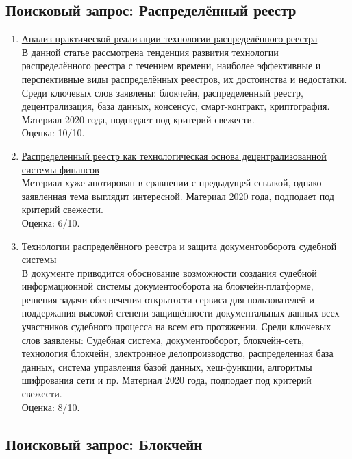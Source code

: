 \documentclass[a4paper, 12pt]{report}		%
\begin{document}
\subsection*{Поисковый запрос: Распределённый реестр}

\begin{enumerate}
\item \href{https://elibrary.ru/item.asp?id=44065996}{Анализ практической реализации технологии распределённого реестра}\\
В данной статье рассмотрена тенденция развития технологии распределённого реестра с течением времени, наиболее эффективные и перспективные виды распределённых реестров, их достоинства и недостатки. Среди ключевых слов заявлены: блокчейн, распределенный реестр, децентрализация, база данных, консенсус, смарт-контракт, криптография. Материал 2020 года, подподает под критерий свежести.\\
Оценка: 10/10.
\item \href{https://elibrary.ru/item.asp?id=44086179}{Распределенный реестр как технологическая основа децентрализованной системы финансов}\\
Метериал хуже анотирован в сравнении с предыдущей ссылкой, однако заявленная тема выглядит интересной. Материал 2020 года, подподает под критерий свежести.\\
Оценка: 6/10.
\item \href{https://cyberleninka.ru/article/n/tehnologii-raspredelyonnogo-reestra-i-zaschita-dokumentooborota-sudebnoy-sistemy}{Технологии распределённого реестра и защита документооборота судебной системы}\\
В документе приводится обоснование возможности создания судебной информационной системы документооборота на блокчейн-платформе, решения задачи обеспечения открытости сервиса для пользователей и поддержания высокой степени защищённости документальных данных всех участников судебного процесса на всем его протяжении. Среди ключевых слов заявлены: Судебная система, документооборот, блокчейн-сеть, технология блокчейн, электронное делопроизводство, распределенная база данных, система управления базой данных, хеш-функции, алгоритмы шифрования сети и пр. Материал 2020 года, подподает под критерий свежести.\\
Оценка: 8/10.
\end{enumerate}

\subsection*{Поисковый запрос: Блокчейн}
\end{document}
